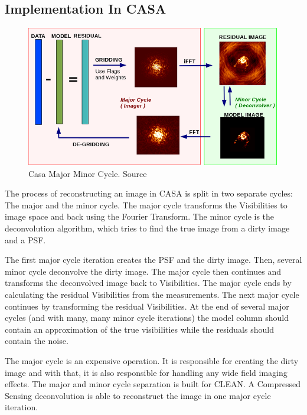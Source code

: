 \subsection{Implementation In CASA}

\begin{figure}
	\centering
	\vspace{-15pt}
	\includegraphics[width=0.9\linewidth]{./chapters/04.cs/img/casa_major_minor.png}
	\caption{Casa Major Minor Cycle. Source \cite{casa2018major}}
	\label{cs:major}
	\vspace{-10pt}
\end{figure}

The process of reconstructing an image in CASA is split in two separate cycles: The major and the minor cycle. The major cycle transforms the Visibilities to image space and back using the Fourier Transform. The minor cycle is the deconvolution algorithm, which tries to find the true image from a dirty image and a PSF. 

The first major cycle iteration creates the PSF and the dirty image. Then, several minor cycle deconvolve the dirty image. The major cycle then continues and transforms the deconvolved image back to Visibilities. The major cycle ends by calculating the residual Visibilities from the measurements. The next major cycle continues by transforming the residual Visibilities. At the end of several major cycles (and with many, many minor cycle iterations) the model column should contain an approximation of the true visibilities while the residuals should contain the noise. 
 
The major cycle is an expensive operation. It is responsible for creating the dirty image and with that, it is also responsible for handling any wide field imaging effects. The major and minor cycle separation is built for CLEAN. A Compressed Sensing deconvolution is able to reconstruct the image in one major cycle iteration. 

